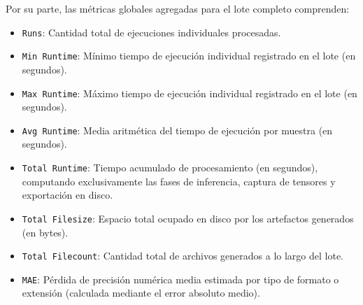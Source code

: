 Por su parte, las métricas globales agregadas para el lote completo comprenden:
\begin{itemize}
    \item \texttt{Runs}: Cantidad total de ejecuciones individuales procesadas.
    \item \texttt{Min Runtime}: Mínimo tiempo de ejecución individual registrado en el lote (en segundos).
    \item \texttt{Max Runtime}: Máximo tiempo de ejecución individual registrado en el lote (en segundos).
    \item \texttt{Avg Runtime}: Media aritmética del tiempo de ejecución por muestra (en segundos).
    \item \texttt{Total Runtime}: Tiempo acumulado de procesamiento (en segundos), computando exclusivamente las 
    fases de inferencia, captura de tensores y exportación en disco.
    \item \texttt{Total Filesize}: Espacio total ocupado en disco por los artefactos generados (en bytes).
    \item \texttt{Total Filecount}: Cantidad total de archivos generados a lo largo del lote.
    \item \texttt{MAE}: Pérdida de precisión numérica media estimada por tipo de formato o extensión 
    (calculada mediante el error absoluto medio).
\end{itemize}